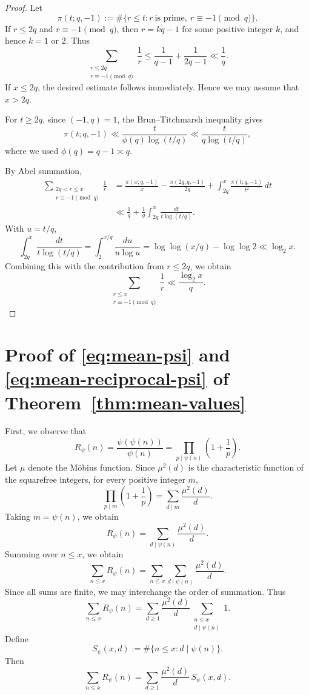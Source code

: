 \documentclass{article}
\theoremstyle{remark}
\begin{document}
\begin{proof}
Let
\[
\pi(t;q,-1)
:=
\#\{r\le t:r\ \text{is prime},\ r\equiv-1\pmod q\}.
\]
If \(r\le2q\) and \(r\equiv-1\pmod q\), then
\(r=kq-1\) for some positive integer \(k\), and hence \(k=1\) or \(2\).
Thus
\[
\sum_{\substack{r\le2q\\r\equiv-1\pmod q}}\frac1r
\le
\frac1{q-1}+\frac1{2q-1}
\ll\frac1q.
\]
If \(x\le2q\), the desired estimate follows immediately. Hence we may
assume that \(x>2q\).

For \(t\ge2q\), since \((-1,q)=1\), the Brun--Titchmarsh inequality
\cite[Theorem~3.9]{MontgomeryVaughan} gives
\[
\pi(t;q,-1)
\ll
\frac{t}{\phi(q)\log(t/q)}
\ll
\frac{t}{q\log(t/q)},
\]
where we used \(\phi(q)=q-1\asymp q\).

By Abel summation,
\[
\begin{aligned}
\sum_{\substack{2q<r\le x\\r\equiv-1\pmod q}}\frac1r
&=
\frac{\pi(x;q,-1)}x
-\frac{\pi(2q;q,-1)}{2q}
+
\int_{2q}^x\frac{\pi(t;q,-1)}{t^2}\,dt\\
&\ll
\frac1q+
\frac1q\int_{2q}^x
\frac{dt}{t\log(t/q)}.
\end{aligned}
\]
With \(u=t/q\),
\[
\int_{2q}^x\frac{dt}{t\log(t/q)}
=
\int_2^{x/q}\frac{du}{u\log u}
=
\log\log(x/q)-\log\log2
\ll\log_2x.
\]
Combining this with the contribution from \(r\le2q\), we obtain
\[
\sum_{\substack{r\le x\\r\equiv-1\pmod q}}\frac1r
\ll
\frac{\log_2x}{q}.
\]
\end{proof}






\section{Proof of \eqref{eq:mean-psi} and
\eqref{eq:mean-reciprocal-psi} of Theorem~\ref{thm:mean-values}}


First, we observe that
\[
R_\psi(n)
=
\frac{\psi(\psi(n))}{\psi(n)}
=
\prod_{p\mid\psi(n)}
\left(1+\frac1p\right).
\]
Let $\mu$ denote the M\"obius function. Since $\mu^2(d)$ is the
characteristic function of the squarefree integers, for every positive
integer $m$,
\[
\prod_{p\mid m}\left(1+\frac1p\right)
=
\sum_{d\mid m}\frac{\mu^2(d)}{d}.
\]
Taking $m=\psi(n)$, we obtain
\[
R_\psi(n)
=
\sum_{d\mid\psi(n)}\frac{\mu^2(d)}{d}.
\]
Summing over $n\le x$, we obtain
\[
\sum_{n\le x}R_\psi(n)
=
\sum_{n\le x}
\sum_{d\mid\psi(n)}
\frac{\mu^2(d)}{d}.
\]
Since all sums are finite, we may interchange the order of summation.
Thus
\[
\sum_{n\le x}R_\psi(n)
=
\sum_{d\ge1}
\frac{\mu^2(d)}{d}
\sum_{\substack{n\le x\\ d\mid\psi(n)}}1.
\]
Define
\[
S_\psi(x,d)
:=
\#\{n\le x:d\mid\psi(n)\}.
\]
Then
\[{\sum_{n\le x}R_\psi(n)
=
\sum_{d\ge1}
\frac{\mu^2(d)}{d}\,S_\psi(x,d).}\]
\end{document}
